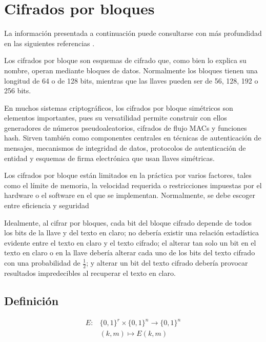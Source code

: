 %
%

\section{Cifrados por bloques}
\label{sec:bloques}

La información presentada a continuación puede consultarse con más profundidad
en las siguientes referencias
\cite{menezes, DBLP:series/isc/DelfsK07}.

Los cifrados por bloque son esquemas de cifrado que, como bien
lo explica su nombre, operan mediante bloques de datos. Normalmente los
bloques tienen una longitud de 64 o de 128 bits, mientras que las llaves
pueden ser de 56, 128, 192 o 256 bits.

En muchos sistemas criptográficos, los cifrados por bloque simétricos
son elementos importantes, pues su versatilidad permite construir con
ellos generadores de números pseudoaleatorios, cifrados de flujo MACs y
funciones hash. Sirven también como componentes centrales en técnicas de
autenticación de mensajes, mecanismos de integridad de datos, protocolos
de autenticación de entidad y esquemas de firma electrónica que usan
llaves simétricas.

Los cifrados por bloque están limitados en la práctica por varios
factores, tales como el límite de memoria, la velocidad requerida o
restricciones impuestas por el hardware o el software en el que se
implementan. Normalmente, se debe escoger entre eficiencia y seguridad

Idealmente, al cifrar por bloques, cada bit del bloque cifrado depende
de todos los bits de la llave y del texto en claro; no debería existir
una relación estadística evidente entre el texto en claro y el texto
cifrado; el alterar tan solo un bit en el texto en claro o en la llave
debería alterar cada uno de los bits del texto cifrado con una
probabilidad de $\frac{1}{2}$; y alterar un bit del texto cifrado
debería provocar resultados impredecibles al recuperar el texto en
claro.

\subsection{Definición}

\begin{equation}
  \label{cifrado_bloques_def}
  \begin{aligned}
    E: {}& \{0,1\}^r \times \{0,1\}^n \longrightarrow \{0,1\}^n \\
         &(k,m) \longmapsto  E(k,m)
  \end{aligned}
\end{equation}

